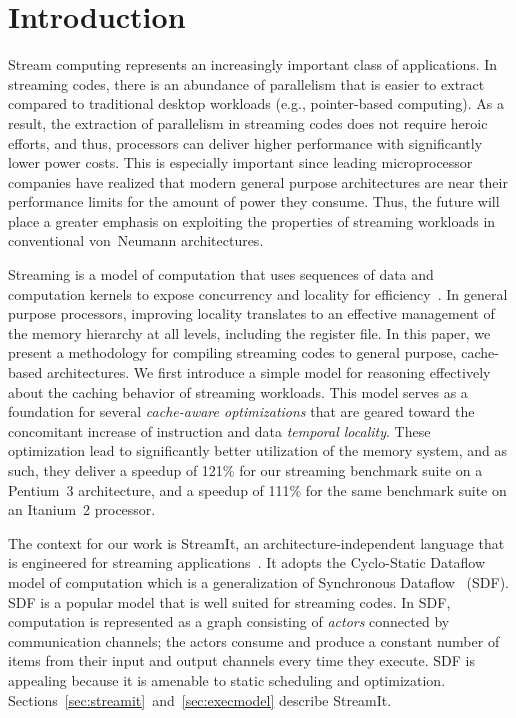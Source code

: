 \section{Introduction}


Stream computing represents an increasingly important class of
applications. In streaming codes, there is an abundance of parallelism that
is easier to extract compared to traditional desktop workloads (e.g.,
pointer-based computing). As a result, the extraction of parallelism
in streaming codes does not require heroic efforts, and thus,
processors can deliver higher performance with significantly lower
power costs. This is especially important since
leading microprocessor companies have realized that modern general
purpose architectures are near their  performance limits for  the
amount of power they consume. Thus, the future will place a greater
emphasis on exploiting the properties of streaming workloads in
conventional von~Neumann architectures.

Streaming is a model of computation that uses sequences of data
and computation kernels to expose concurrency and locality for
efficiency~\cite{wss}. In general purpose processors, improving locality 
translates to an effective management of the memory hierarchy at all
levels, including the register file. In this paper, we present a
methodology for compiling streaming codes to general purpose,
cache-based architectures. We first introduce a simple model for
reasoning effectively about the caching behavior of streaming
workloads. This model serves as a foundation for several {\it cache-aware
optimizations} that are geared toward the concomitant increase of instruction
and data {\it temporal locality}. These
optimization lead to significantly better utilization of the memory
system, and as such, they deliver
a speedup of 121\% for our streaming benchmark suite on a Pentium~3 
architecture, and a speedup of 111\% for the same benchmark suite on
an Itanium~2 processor.


The context for our work is StreamIt, an architecture-independent
language that is engineered for streaming
applications~\cite{streamitcc}. It adopts the 
Cyclo-Static Dataflow~\cite{BELP96} model of computation which is a
generalization of Synchronous Dataflow~\cite{LM87-i} (SDF).  
SDF is a popular  model that  is well suited for
streaming codes. In SDF, computation is represented as a graph
consisting of {\it  actors} connected by communication channels; the
actors consume  and produce a constant number  of items from their
input and output  channels every time they execute. SDF is appealing
because it is amenable to static scheduling and
optimization. Sections~\ref{sec:streamit}~and~\ref{sec:execmodel}
describe StreamIt.

